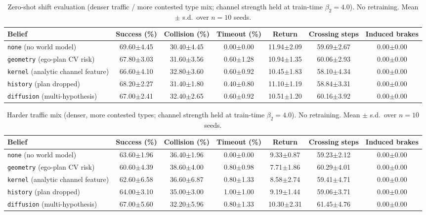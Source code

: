 \documentclass[conference]{IEEEtran}
\begin{document}
\begin{table}[!t]
\caption{Zero-shot shift evaluation (denser traffic / more contested type mix; channel strength held at train-time $\beta_2{=}4.0$). No retraining. Mean $\pm$ s.d.\ over $n{=}10$ seeds.}
\label{tab:shift}
\centering
\begin{tabular}{|l|c|c|c|c|c|c|}
\hline
\textbf{Belief} & \textbf{Success (\%)} & \textbf{Collision (\%)} & \textbf{Timeout (\%)} & \textbf{Return} & \textbf{Crossing steps} & \textbf{Induced brakes} \\
\hline
\texttt{none} (no world model) & 69.60$\pm$4.45 & 30.40$\pm$4.45 & 0.00$\pm$0.00 & 11.94$\pm$2.09 & 59.69$\pm$2.67 & 0.00$\pm$0.00 \\ %
\hline
\texttt{geometry} (ego-plan CV risk) & 67.80$\pm$3.03 & 31.60$\pm$3.56 & 0.60$\pm$1.28 & 10.94$\pm$1.35 & 60.06$\pm$2.93 & 0.00$\pm$0.00 \\ %
\hline
\texttt{kernel} (analytic channel feature) & 66.60$\pm$4.10 & 32.80$\pm$3.60 & 0.60$\pm$0.92 & 10.45$\pm$1.83 & 58.10$\pm$4.34 & 0.00$\pm$0.00 \\ %
\hline
\texttt{history} (plan dropped) & 68.20$\pm$2.27 & 31.40$\pm$1.80 & 0.40$\pm$0.80 & 11.10$\pm$1.19 & 58.84$\pm$3.31 & 0.00$\pm$0.00 \\ %
\hline
\texttt{diffusion} (multi-hypothesis) & 67.00$\pm$2.41 & 32.40$\pm$2.65 & 0.60$\pm$0.92 & 10.51$\pm$1.20 & 60.16$\pm$3.92 & 0.00$\pm$0.00 \\ %
\hline
\end{tabular}
\end{table}

\begin{table}[!t]
\caption{Harder traffic mix (denser, more contested types; channel strength held at train-time $\beta_2{=}4.0$). No retraining. Mean $\pm$ s.d.\ over $n{=}10$ seeds.}
\label{tab:hard}
\centering
\begin{tabular}{|l|c|c|c|c|c|c|}
\hline
\textbf{Belief} & \textbf{Success (\%)} & \textbf{Collision (\%)} & \textbf{Timeout (\%)} & \textbf{Return} & \textbf{Crossing steps} & \textbf{Induced brakes} \\
\hline
\texttt{none} (no world model) & 63.60$\pm$1.96 & 36.40$\pm$1.96 & 0.00$\pm$0.00 & 9.33$\pm$0.87 & 59.23$\pm$2.12 & 0.00$\pm$0.00 \\ %
\hline
\texttt{geometry} (ego-plan CV risk) & 60.60$\pm$4.39 & 38.60$\pm$4.00 & 0.80$\pm$0.98 & 7.71$\pm$1.86 & 60.29$\pm$4.01 & 0.00$\pm$0.00 \\ %
\hline
\texttt{kernel} (analytic channel feature) & 62.60$\pm$6.58 & 36.60$\pm$6.87 & 0.80$\pm$1.33 & 8.58$\pm$2.74 & 59.41$\pm$4.71 & 0.00$\pm$0.00 \\ %
\hline
\texttt{history} (plan dropped) & 64.00$\pm$3.10 & 35.00$\pm$3.00 & 1.00$\pm$1.00 & 9.19$\pm$1.44 & 59.06$\pm$3.71 & 0.00$\pm$0.00 \\ %
\hline
\texttt{diffusion} (multi-hypothesis) & 67.00$\pm$5.60 & 32.20$\pm$5.96 & 0.80$\pm$1.33 & 10.30$\pm$2.31 & 61.45$\pm$4.76 & 0.00$\pm$0.00 \\ %
\hline
\end{tabular}
\end{table}
\end{document}
